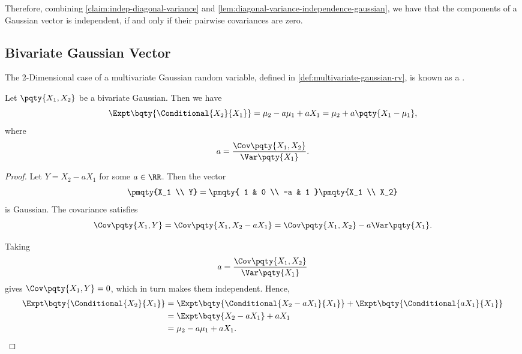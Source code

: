 Therefore, combining \autoref{claim:indep-diagonal-variance} and \autoref{lem:diagonal-variance-independence-gaussian}, we have that the components of a Gaussian vector is independent, if and only if their pairwise covariances are zero.

\subsection{Bivariate Gaussian Vector}

\begin{definition}
    \label{def:bivariate-gaussian-vector}%
    The 2-Dimensional case of a multivariate Gaussian random variable, defined in \autoref{def:multivariate-gaussian-rv}, is known as a .
\end{definition}

\begin{proposition}
    Let \(\pqty{X_1, X_2}\) be a bivariate Gaussian. Then we have
    \[
        \Expt\bqty{\Conditional{X_2}{X_1}} = \mu_2 - a \mu_1 + a X_1 = \mu_2 + a \pqty{X_1 - \mu_1},
    \]
    where
    \[
        a = \frac{\Cov\pqty{X_1, X_2}}{\Var\pqty{X_1}}.
    \]
\end{proposition}


\begin{proof}
    Let \(Y = X_2 - a X_1\) for some \(a \in \RR\). Then the vector
    \[
        \pmqty{X_1 \\ Y}
        =
        \pmqty{
            1 & 0 \\
            -a & 1
        }
        \pmqty{X_1 \\ X_2}
    \]
    is Gaussian. The covariance satisfies
    \[
        \Cov\pqty{X_1, Y} = \Cov\pqty{X_1, X_2 - a X_1} = \Cov\pqty{X_1, X_2} - a \Var\pqty{X_1}.
    \]
    
    Taking
    \[
        a = \frac{\Cov\pqty{X_1, X_2}}{\Var\pqty{X_1}}
    \]
    gives \(\Cov\pqty{X_1, Y} = 0\), which in turn makes them independent. Hence,
    \begin{align*}
        \Expt\bqty{\Conditional{X_2}{X_1}} &= \Expt\bqty{\Conditional{X_2 - a X_1}{X_1}} + \Expt\bqty{\Conditional{a X_1}{X_1}} \\
        &= \Expt\bqty{X_2 - a X_1} + a X_1 \\
        &= \mu_2 - a \mu_1 + a X_1.
    \end{align*}
\end{proof}